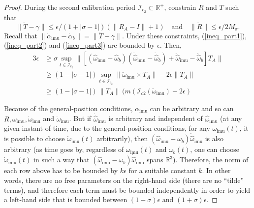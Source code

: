 \documentclass[]{article}
\def\real{\mathbb{R}}
\def\w{\omega}
\def\hw{{\widehat\w}}
\def\RR{\mathbb{R}}
\def\imu{_\mathrm{imu}}
\def\m{{m}}
\def\I{\mathcal{I}}
\begin{document}
\begin{proof}
\bigskip
During the second calibration period $\I_{c_2}\subset\RR^+$, constrain $R$ and $T$ such that
$$\|\ddot T-\gamma\|\leq\epsilon/(1+|\sigma-1|)(\|R_A-I\|+1)\quad\text{and}\quad
\|\ddot R\|\leq\epsilon/2M_\sigma.$$
Recall that $\|\dot\alpha\imu-\dot\alpha_b\| = \|\ddot T-\gamma\|$.  Under these constraints, 
(\ref{ineq_part1}), (\ref{ineq_part2}) and (\ref{ineq_part3}) are bounded by $\epsilon$.  Then,
\begin{align*}
3\epsilon &\geq\sigma\sup_{t\in\I_{c_2}}\|[(\hw\imu  - \hw_b)(\dot\hw\imu  - \dot\hw_b) + \ddot{\hw}\imu  - \ddot{\hw}_b ] T_A\|\\
&\geq(1-|\sigma-1|)\!\sup_{t\in\I_{c_2}}\|\ddot\w\imu\times T_A\| - 2\epsilon\|T_A\|\\
&\geq(1-|\sigma-1|)\,\|T_A\|\,(\m({\I_{c2}}(\ddot\w\imu) - 2\epsilon)
\end{align*}



Because of the general-position conditions, $\alpha\imu $ can be arbitrary and so can $R, \w\imu , {\dot \w}\imu $ and ${\ddot \w}\imu $. But if $\dot \hw\imu $ is arbitrary and independent of $\hw\imu $ (at any given instant of time, due to the general-position conditions, for any $\w\imu (t)$, it is possible to choose $\dot \w\imu (t)$ arbitrarily), then $(\hw\imu -\w_b)\dot\hw\imu $ is also arbitrary (as time goes by, regardless of $\w\imu (t)$ and $\w_b(t)$, one can choose $\dot \w\imu (t)$ in such a way that $(\hw\imu -\w_b)\dot\hw\imu $ spans $\real^3$). Therefore, the norm of each row above has to be bounded by $k\epsilon$ for a suitable constant $k$. In other words, there are no free parameters on the right-hand side (there are no ``tilde'' terms), and therefore each term must be bounded independently in order to yield a left-hand side that is bounded 
between $(1 - \sigma)\epsilon$ and $(1 + \sigma)\epsilon$. 


\end{proof}
\end{document}
